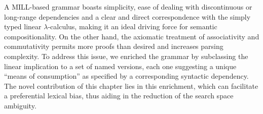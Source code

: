 A MILL-based grammar boasts simplicity, ease of dealing with discontinuous or long-range dependencies and a clear and direct correspondence with the simply typed linear $\lambda$-calculus, making it an ideal driving force for semantic compositionality.
On the other hand, the axiomatic treatment of associativity and commutativity permits more proofs than desired and increases parsing complexity.
To address this issue, we enriched the grammar by subclassing the linear implication to a set of named versions, each one suggesting a unique ``means of consumption'' as specified by a corresponding syntactic dependency.
The novel contribution of this chapter lies in this enrichment, which can facilitate a preferential lexical bias, thus aiding in the reduction of the search space ambiguity.